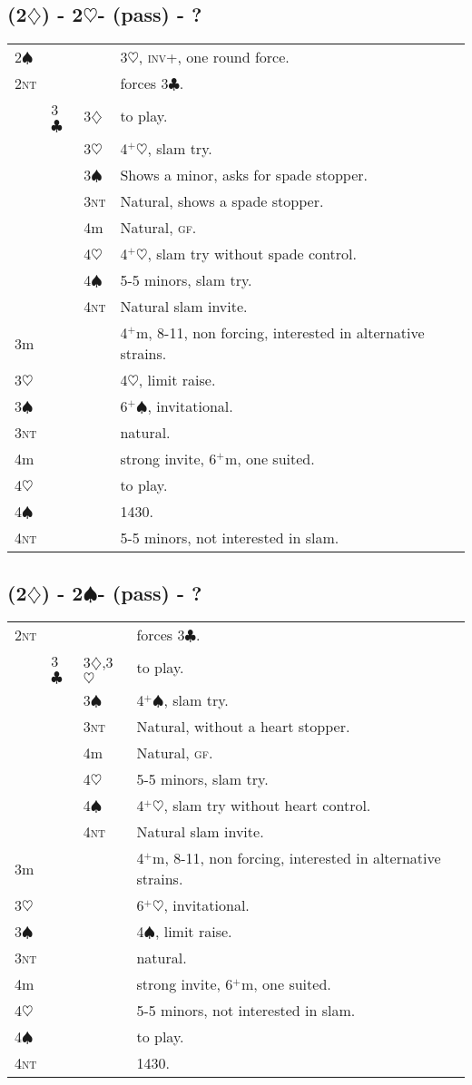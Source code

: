 \documentclass{article}
\newcommand{\gf}{\textsc{gf}}
\newcommand{\inv}{\textsc{inv}}
\renewcommand{\c}{\ensuremath{\clubsuit}}
\renewcommand{\d}{\ensuremath{\diamondsuit}}
\newcommand{\h}{\ensuremath{\heartsuit}}
\newcommand{\s}{\ensuremath{\spadesuit}}
\newcommand{\nt}{\textsc{nt}}
\newcommand{\+}{\ensuremath{^+}}
\begin{document}
\subsection{(2\d) - 2\h - (pass) - ?}
\begin{tabular}{llll}
2\s &&& 3\h, \inv+, one round force.\\
2\nt &&& forces 3\c.\\
& 3\c & 3\d & to play.\\
&& 3\h & 4\+\h, slam try.\\
&& 3\s & Shows a minor, asks for spade stopper.\\
&& 3\nt & Natural, shows a spade stopper.\\
&& 4m & Natural, \gf.\\
&& 4\h & 4\+\h, slam try without spade control.\\
&& 4\s & 5-5 minors, slam try.\\
&& 4\nt & Natural slam invite.\\
3m &&& 4\+m, 8-11, non forcing, interested in alternative strains.\\
3\h &&& 4\h, limit raise.\\
3\s &&& 6\+\s, invitational.\\
3\nt &&& natural.\\
4m &&& strong invite, 6\+m, one suited.\\
4\h &&& to play.\\
4\s &&& 1430.\\
4\nt &&& 5-5 minors, not interested in slam.\\
\end{tabular}

\subsection{(2\d) - 2\s - (pass) - ?}
\begin{tabular}{llll}
2\nt &&& forces 3\c.\\
& 3\c & 3\d,3\h & to play.\\
&& 3\s & 4\+\s, slam try.\\
&& 3\nt & Natural, without a heart stopper.\\
&& 4m & Natural, \gf.\\
&& 4\h & 5-5 minors, slam try.\\
&& 4\s & 4\+\h, slam try without heart control.\\
&& 4\nt & Natural slam invite.\\
3m &&& 4\+m, 8-11, non forcing, interested in alternative strains.\\
3\h &&& 6\+\h, invitational.\\
3\s &&& 4\s, limit raise.\\
3\nt &&& natural.\\
4m &&& strong invite, 6\+m, one suited.\\
4\h &&& 5-5 minors, not interested in slam.\\
4\s &&& to play.\\
4\nt &&& 1430.\\
\end{tabular}
\end{document}
